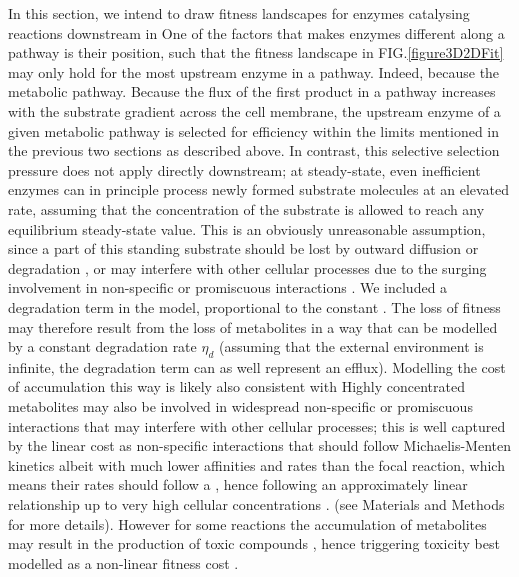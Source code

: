 \documentclass[11pt,onecolumn]{article}
\providecommand{\DIFadd}[1]{{\protect\color{blue} \sf #1}} %
\providecommand{\DIFdel}[1]{{\protect\color{red} \scriptsize #1}} %
\providecommand{\DIFaddbegin}{} %
\providecommand{\DIFaddend}{} %
\providecommand{\DIFdelbegin}{} %
\providecommand{\DIFdelend}{} %
\begin{document}
\DIFdelbegin \DIFdel{In this section, we intend to draw fitness landscapes for enzymes catalysing reactions downstream in }\DIFdelend \DIFaddbegin \DIFadd{One of the factors that makes enzymes different along a pathway is their position, such that the fitness landscape in FIG.\ref{figure3D2DFit} may only hold for the most upstream enzyme in a pathway. Indeed, because }\DIFaddend the \DIFdelbegin \DIFdel{metabolic pathway. Because the }\DIFdelend flux of the first product in a pathway increases with the substrate gradient across the cell membrane, the upstream enzyme of a given metabolic pathway is selected for efficiency \DIFdelbegin \DIFdel{within the limits mentioned in the previous two sections}\DIFdelend \DIFaddbegin \DIFadd{as described above}\DIFaddend . In contrast, this \DIFdelbegin \DIFdel{selective }\DIFdelend \DIFaddbegin \DIFadd{selection }\DIFaddend pressure does not apply directly downstream; at steady-state, even inefficient enzymes can in principle process newly formed substrate molecules at an elevated rate, assuming that the concentration of the substrate is allowed to reach any \DIFdelbegin \DIFdel{equilibrium }\DIFdelend \DIFaddbegin \DIFadd{steady-state }\DIFaddend value. This is an obviously unreasonable assumption, since a part of this standing substrate should be lost by outward diffusion or degradation \DIFdelbegin \DIFdel{, or may interfere with other cellular processes due to the surging involvement in non-specific or promiscuous interactions \citep{Khersonsky10,Schauble13}. We included a degradation term in the model, proportional to the constant }\DIFdelend \DIFaddbegin \DIFadd{\citep{Jones15,Bosdriesz18}. The loss of fitness may therefore result from the loss of metabolites in a way that can be modelled by a constant degradation rate }\DIFaddend $\eta_{d}$ \DIFaddbegin \DIFadd{\citep{Chou14} }\DIFaddend (assuming that the external environment is infinite, the degradation term can as well represent an efflux). \DIFdelbegin \DIFdel{Modelling the cost of accumulation this way is likely also consistent with }\DIFdelend \DIFaddbegin \DIFadd{Highly concentrated metabolites may also be involved in widespread }\DIFaddend non-specific \DIFaddbegin \DIFadd{\citep{Keller15} or promiscuous interactions \citep{Khersonsky10,Schauble13,Peracchi18} that may interfere with other cellular processes; this is well captured by the linear cost as non-specific }\DIFaddend interactions \DIFdelbegin \DIFdel{that }\DIFdelend should follow Michaelis-Menten kinetics albeit with much lower affinities\DIFdelbegin \DIFdel{and rates than the focal reaction, which means their rates should follow a }\DIFdelend \DIFaddbegin \DIFadd{, hence following an approximately }\DIFaddend linear relationship up to very high cellular concentrations \DIFdelbegin \DIFdel{.
}\DIFdelend \DIFaddbegin \DIFadd{(see Materials and Methods for more details). However for some reactions the accumulation of metabolites may result in the production of toxic compounds \citep{Lilja17, Niehaus20}, hence triggering toxicity best modelled as a non-linear fitness cost \citep{Clark91,Wright10}.
}\DIFaddend 
\end{document}
